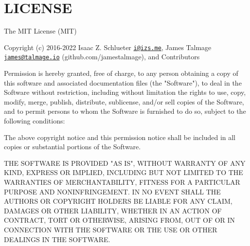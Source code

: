 \chapter{LICENSE }
\hypertarget{md__c_1_2xampp_2htdocs_2_g_pagos_ayuntamiento_2node__modules_2stack-utils_2_l_i_c_e_n_s_e}{}\label{md__c_1_2xampp_2htdocs_2_g_pagos_ayuntamiento_2node__modules_2stack-utils_2_l_i_c_e_n_s_e}
The MIT License (MIT)

Copyright (c) 2016-\/2022 Isaac Z. Schlueter \href{mailto:i@izs.me}{\texttt{i@izs.\+me}}, James Talmage \href{mailto:james@talmage.io}{\texttt{james@talmage.\+io}} (github.\+com/jamestalmage), and Contributors

Permission is hereby granted, free of charge, to any person obtaining a copy of this software and associated documentation files (the "{}\+Software"{}), to deal in the Software without restriction, including without limitation the rights to use, copy, modify, merge, publish, distribute, sublicense, and/or sell copies of the Software, and to permit persons to whom the Software is furnished to do so, subject to the following conditions\+:

The above copyright notice and this permission notice shall be included in all copies or substantial portions of the Software.

THE SOFTWARE IS PROVIDED "{}\+AS IS"{}, WITHOUT WARRANTY OF ANY KIND, EXPRESS OR IMPLIED, INCLUDING BUT NOT LIMITED TO THE WARRANTIES OF MERCHANTABILITY, FITNESS FOR A PARTICULAR PURPOSE AND NONINFRINGEMENT. IN NO EVENT SHALL THE AUTHORS OR COPYRIGHT HOLDERS BE LIABLE FOR ANY CLAIM, DAMAGES OR OTHER LIABILITY, WHETHER IN AN ACTION OF CONTRACT, TORT OR OTHERWISE, ARISING FROM, OUT OF OR IN CONNECTION WITH THE SOFTWARE OR THE USE OR OTHER DEALINGS IN THE SOFTWARE. 